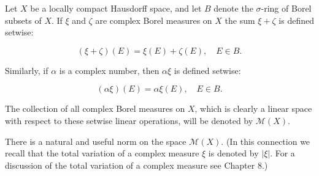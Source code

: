 Let $X$ be a locally compact Hausdorff space, and let $B$ denote the $\sigma$-ring of Borel subsets of $X$. If $\xi$ and $\zeta$ are complex Borel measures on $X$ the sum $\xi + \zeta$ is defined setwise:

$$(\xi + \zeta)(E) = \xi(E) + \zeta(E), \quad E \in B.$$

Similarly, if $\alpha$ is a complex number, then $\alpha\xi$ is defined setwise:

$$(\alpha\xi)(E) = \alpha\xi(E), \quad E \in B.$$

The collection of all complex Borel measures on $X$, which is clearly a linear space with respect to these setwise linear operations, will be denoted by $\mathcal{M}(X)$.

There is a natural and useful norm on the space $\mathcal{M}(X)$. (In this connection we recall that the total variation of a complex measure $\xi$ is denoted by $|\xi|$. For a discussion of the total variation of a complex measure see Chapter 8.)

